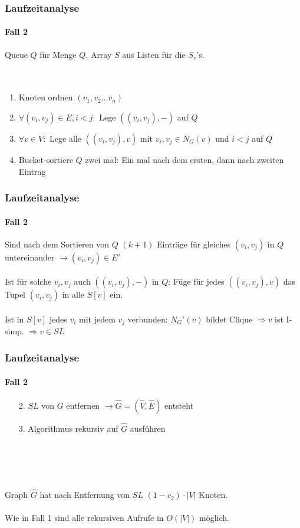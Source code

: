 \begin{frame}
\frametitle{Laufzeitanalyse}
\framesubtitle{Fall 2}

Queue $Q$ für Menge $Q$, Array $S$ aus Listen für die $S_v$'s. \\
\ \\
\ \\

\begin{enumerate}
	\item Knoten ordnen $(v_1, v_2 \dots v_n)$
	\item $\forall (v_i, v_j) \in E, i < j:$ Lege $((v_i, v_j), -)$ auf $Q$
	\item $\forall v \in V:$ Lege alle $((v_i, v_j), v)$ mit $v_i, v_j \in N_G(v)$ und $i < j$ auf $Q$
	\item Bucket-sortiere $Q$ zwei mal: Ein mal nach dem ersten, dann nach zweiten Eintrag
\end{enumerate}


\end{frame}


\begin{frame}
\frametitle{Laufzeitanalyse}
\framesubtitle{Fall 2}

Sind nach dem Sortieren von $Q$ $(k+1)$ Einträge für gleiches $(v_i, v_j)$ in $Q$ untereinander $\rightarrow (v_i, v_j) \in E'$ \\
\ \\
Ist für solche $v_i, v_j$ auch $((v_i, v_j), -)$ in $Q$: Füge für jedes $((v_i, v_j), v)$ das Tupel $(v_i, v_j)$ in alle $S[v]$ ein.\\
\ \\
Ist in $S[v]$ jedes $v_i$ mit jedem $v_j$ verbunden: $N_G'(v)$ bildet Clique $\Rightarrow v$ ist I-simp. $\Rightarrow v \in SL$
\end{frame}


\begin{frame}
\frametitle{Laufzeitanalyse}
\framesubtitle{Fall 2}

\begin{enumerate}
	\item[2.] $SL$ von $G$ entfernen $\rightarrow \widehat{G}=(\widehat{V}, \widehat{E})$ entsteht %
	\item[3.] Algorithmus rekursiv auf $\widehat{G}$ ausführen
\end{enumerate}
\ \\
\ \\
\ \\
\ \\
Graph $\widehat{G}$ hat nach Entfernung von $SL$ $(1 - c_2) \cdot |V|$ Knoten. \\
\ \\
Wie in Fall 1 sind alle rekursiven Aufrufe in $O(|V|)$ möglich. \\

\end{frame}



